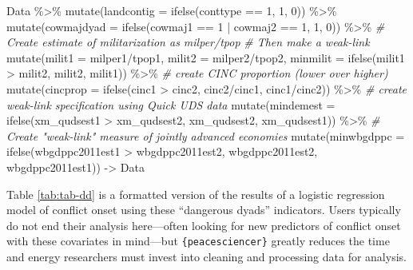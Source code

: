 \documentclass[
  11pt,
]{article}
\newenvironment{Shaded}{\begin{snugshade}}{\end{snugshade}}
\newcommand{\AttributeTok}[1]{\textcolor[rgb]{0.77,0.63,0.00}{#1}}
\newcommand{\CommentTok}[1]{\textcolor[rgb]{0.56,0.35,0.01}{\textit{#1}}}
\newcommand{\DecValTok}[1]{\textcolor[rgb]{0.00,0.00,0.81}{#1}}
\newcommand{\FunctionTok}[1]{\textcolor[rgb]{0.00,0.00,0.00}{#1}}
\newcommand{\NormalTok}[1]{#1}
\newcommand{\OtherTok}[1]{\textcolor[rgb]{0.56,0.35,0.01}{#1}}
\newcommand{\SpecialCharTok}[1]{\textcolor[rgb]{0.00,0.00,0.00}{#1}}
\begin{document}
\begin{Shaded}
\begin{Highlighting}[]
\NormalTok{Data }\SpecialCharTok{\%\textgreater{}\%}
  \FunctionTok{mutate}\NormalTok{(}\AttributeTok{landcontig =} \FunctionTok{ifelse}\NormalTok{(conttype }\SpecialCharTok{==} \DecValTok{1}\NormalTok{, }\DecValTok{1}\NormalTok{, }\DecValTok{0}\NormalTok{)) }\SpecialCharTok{\%\textgreater{}\%}
  \FunctionTok{mutate}\NormalTok{(}\AttributeTok{cowmajdyad =} \FunctionTok{ifelse}\NormalTok{(cowmaj1 }\SpecialCharTok{==} \DecValTok{1} \SpecialCharTok{|}\NormalTok{ cowmaj2 }\SpecialCharTok{==} \DecValTok{1}\NormalTok{, }\DecValTok{1}\NormalTok{, }\DecValTok{0}\NormalTok{)) }\SpecialCharTok{\%\textgreater{}\%}
  \CommentTok{\# Create estimate of militarization as milper/tpop}
  \CommentTok{\# Then make a weak{-}link}
  \FunctionTok{mutate}\NormalTok{(}\AttributeTok{milit1 =}\NormalTok{ milper1}\SpecialCharTok{/}\NormalTok{tpop1,}
         \AttributeTok{milit2 =}\NormalTok{ milper2}\SpecialCharTok{/}\NormalTok{tpop2,}
         \AttributeTok{minmilit =} \FunctionTok{ifelse}\NormalTok{(milit1 }\SpecialCharTok{\textgreater{}}\NormalTok{ milit2,}
\NormalTok{                           milit2, milit1)) }\SpecialCharTok{\%\textgreater{}\%}
  \CommentTok{\# create CINC proportion (lower over higher)}
  \FunctionTok{mutate}\NormalTok{(}\AttributeTok{cincprop =} \FunctionTok{ifelse}\NormalTok{(cinc1 }\SpecialCharTok{\textgreater{}}\NormalTok{ cinc2,}
\NormalTok{                           cinc2}\SpecialCharTok{/}\NormalTok{cinc1, cinc1}\SpecialCharTok{/}\NormalTok{cinc2)) }\SpecialCharTok{\%\textgreater{}\%}
  \CommentTok{\# create weak{-}link specification using Quick UDS data}
  \FunctionTok{mutate}\NormalTok{(}\AttributeTok{mindemest =} \FunctionTok{ifelse}\NormalTok{(xm\_qudsest1 }\SpecialCharTok{\textgreater{}}\NormalTok{ xm\_qudsest2,}
\NormalTok{                            xm\_qudsest2, xm\_qudsest1)) }\SpecialCharTok{\%\textgreater{}\%}
  \CommentTok{\# Create "weak{-}link" measure of jointly advanced economies}
  \FunctionTok{mutate}\NormalTok{(}\AttributeTok{minwbgdppc =} \FunctionTok{ifelse}\NormalTok{(wbgdppc2011est1 }\SpecialCharTok{\textgreater{}}\NormalTok{ wbgdppc2011est2,}
\NormalTok{                             wbgdppc2011est2, wbgdppc2011est1)) }\OtherTok{{-}\textgreater{}}\NormalTok{ Data}
\end{Highlighting}
\end{Shaded}

Table \ref{tab:tab-dd} is a formatted version of the results of a logistic regression model of conflict onset using these ``dangerous dyads'' indicators. Users typically do not end their analysis here---often looking for new predictors of conflict onset with these covariates in mind---but \texttt{\{peacesciencer\}} greatly reduces the time and energy researchers must invest into cleaning and processing data for analysis.
\end{document}
